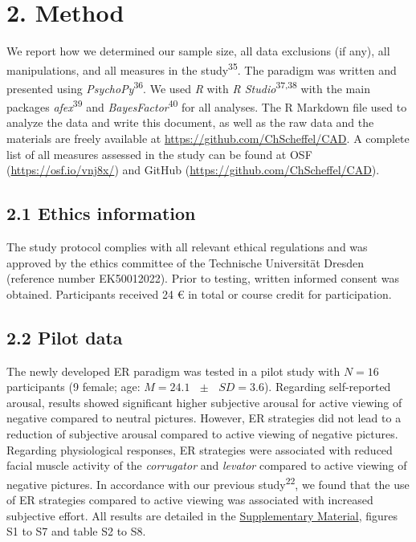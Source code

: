 \documentclass[
  man,floatsintext]{apa6}
\begin{document}
\hypertarget{method}{%
\section{2. Method}\label{method}}

We report how we determined our sample size, all data exclusions (if any), all manipulations, and all measures in the study\textsuperscript{35}.
The paradigm was written and presented using \emph{PsychoPy}\textsuperscript{36}.
We used \emph{R} with \emph{R Studio}\textsuperscript{37,38} with the main packages \emph{afex}\textsuperscript{39} and \emph{BayesFactor}\textsuperscript{40} for all analyses.
The R Markdown file used to analyze the data and write this document, as well as the raw data and the materials are freely available at \url{https://github.com/ChScheffel/CAD}.
A complete list of all measures assessed in the study can be found at OSF (\url{https://osf.io/vnj8x/}) and GitHub (\url{https://github.com/ChScheffel/CAD}).

\hypertarget{ethics-information}{%
\subsection{2.1 Ethics information}\label{ethics-information}}

The study protocol complies with all relevant ethical regulations and was approved by the ethics committee of the Technische Universität Dresden (reference number EK50012022).
Prior to testing, written informed consent was obtained.
Participants received 24 € in total or course credit for participation.

\hypertarget{pilot-data}{%
\subsection{2.2 Pilot data}\label{pilot-data}}

The newly developed ER paradigm was tested in a pilot study with \(N=16\) participants (9 female; age: \(M = 24.1\text{ }\pm\text{ }SD = 3.6\)).
Regarding self-reported arousal, results showed significant higher subjective arousal for active viewing of negative compared to neutral pictures.
However, ER strategies did not lead to a reduction of subjective arousal compared to active viewing of negative pictures.
Regarding physiological responses, ER strategies were associated with reduced facial muscle activity of the \emph{corrugator} and \emph{levator} compared to active viewing of negative pictures.
In accordance with our previous study\textsuperscript{22}, we found that the use of ER strategies compared to active viewing was associated with increased subjective effort.
All results are detailed in the \protect\hyperlink{SupplementaryMaterial}{Supplementary Material}, figures S1 to S7 and table S2 to S8.
\end{document}
